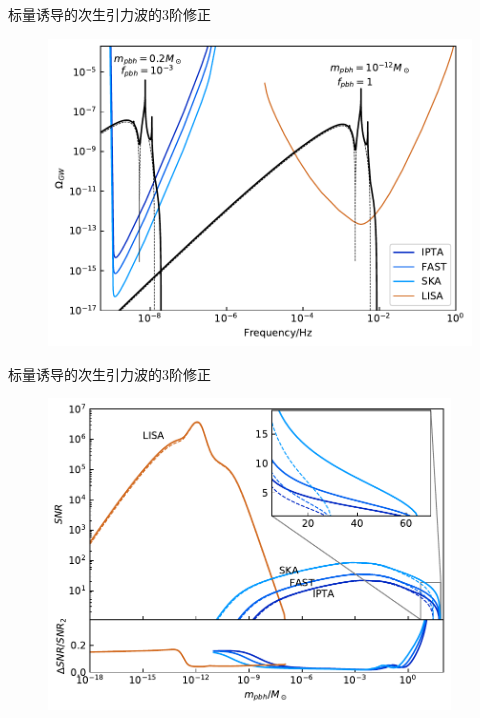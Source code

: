 \documentclass[xcolor=dvipsnames]{beamer} %
\begin{document}
\begin{frame}{标量诱导的次生引力波的$3$阶修正}	
    \vspace{-2.5mm}
    \begin{figure}[htbp!]
        \centering
        \includegraphics[width = \textwidth]{./pic/OmegaGW.pdf}
    \end{figure}
\end{frame}

\begin{frame}{标量诱导的次生引力波的$3$阶修正}
    \vspace{-2.5mm} 
\begin{figure}[htbp!]
    \centering
    \includegraphics[width = 0.95\textwidth]{./pic/SNR.pdf}
\end{figure}
\end{frame}
\end{document}
